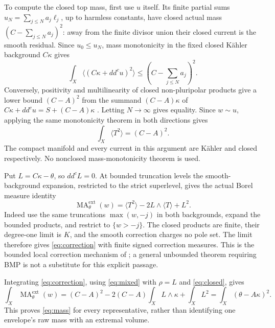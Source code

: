\documentclass[11pt]{article}
\newcommand{\ddc}{dd^c}
\newcommand{\NP}[1]{\langle #1\rangle}
\theoremstyle{remark}\newtheorem{remark}[theorem]{Remark}
\begin{document}
To compute the closed top mass, first use $u$ itself. Its finite
partial sums $u_N=\sum_{j\leq N}a_j\ell_j$, up to harmless constants,
have closed actual mass $(C-\sum_{j\leq N}a_j)^2$: away from the
finite divisor union their closed current is the smooth residual.
Since $u_0\leq u_N$, mass monotonicity in the fixed closed K\"ahler
background $C\kappa$ \cite[Theorem 1.2]{WN} gives
\[
 \int_X\NP{(C\kappa+\ddc u)^2}
 \leq\left(C-\sum_{j\leq N}a_j\right)^2.
\]
Conversely, positivity and multilinearity of closed non-pluripolar
products give a lower bound $(C-A)^2$ from the summand
$(C-A)\kappa$ of $C\kappa+\ddc u=S+(C-A)\kappa$
\cite[Propositions 1.4(c), 1.6]{BEGZ}. Letting $N\to\infty$ gives
equality. Since $w\sim u$, applying the same monotonicity theorem
in both directions gives
\begin{equation}\label{eq:closed}
 \int_X\NP{T^2}=(C-A)^2.
\end{equation}
The compact manifold and every current in this argument are K\"ahler
and closed respectively. No nonclosed mass-monotonicity theorem is used.

Put $L=C\kappa-\theta$, so $\ddc L=0$. At bounded truncation levels
the smooth-background expansion, restricted to the strict superlevel,
gives the actual Borel measure identity
\begin{equation}\label{eq:correction}
 \operatorname{MA}^{\mathrm{ext}}_\theta(w)
 =\NP{T^2}-2L\wedge\NP{T}+L^2.
\end{equation}
Indeed use the same truncations $\max(w,-j)$ in both backgrounds,
expand the bounded products, and restrict to $\{w>-j\}$.
The closed products are finite, their degree-one limit is $K$, and
the smooth correction charges no pole set. The limit therefore gives
\eqref{eq:correction} with finite signed correction measures.
This is the bounded local correction mechanism of
\cite[Section 2.1]{BGL}; a general unbounded theorem requiring BMP
is not a substitute for this explicit passage.

Integrating \eqref{eq:correction}, using \eqref{eq:mixed} with
$\rho=L$ and \eqref{eq:closed}, gives
\[
 \int_X\operatorname{MA}^{\mathrm{ext}}_\theta(w)
 =(C-A)^2-2(C-A)\int_XL\wedge\kappa+\int_XL^2
 =\int_X(\theta-A\kappa)^2.
\]
This proves \eqref{eq:mass} for every representative, rather than
identifying one envelope's raw mass with an extremal volume.
\end{document}
